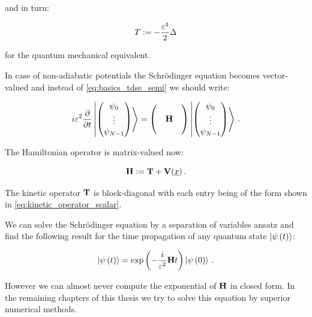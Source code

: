 and in turn:

\begin{equation} \label{eq:kinetic_operator_scalar}
  T := - \frac{\varepsilon^4}{2} \Delta
\end{equation}

for the quantum mechanical equivalent.

In case of non-adiabatic potentials the Schrödinger equation becomes vector-valued
and instead of \eqref{eq:basics_tdse_semi} we should write:

\begin{equation} \label{eq:basics_tdse_vector}
  i \varepsilon^2 \frac{\partial}{\partial t} \Ket{ \begin{pmatrix}
                                                   \psi_0 \\
                                                   \vdots \\
                                                   \psi_{N-1}
                                                 \end{pmatrix}
                                               }
  =
  \begin{pmatrix}
    {} & {}       & {} \\
    {} & \mathbf{H}  & {} \\
    {} & {}       & {}
  \end{pmatrix}
  \Ket{ \begin{pmatrix}
          \psi_0 \\
          \vdots \\
          \psi_{N-1}
        \end{pmatrix} } \,.
\end{equation}

The Hamiltonian operator is matrix-valued now:

\begin{equation}
  \mathbf{H} := \mathbf{T} + \mathbf{V}(\underline{x}) \,.
\end{equation}

The kinetic operator $\mathbf{T}$ is block-diagonal with each entry being of
the form shown in \eqref{eq:kinetic_operator_scalar}.

We can solve the Schrödinger equation by a separation of variables ansatz and
find the following result for the time propagation of any quantum state $\Ket{\psi\left( t \right)}$:

\begin{equation} \label{eq:basics_analytic_time_propagation}
  \Ket{\psi\left( t \right)} = \exp\left(- \frac{i}{\varepsilon^2} \mathbf{H} t \right) \Ket{\psi\left( 0 \right)} \,.
\end{equation}

However we can almost never compute the exponential of $\mathbf{H}$ in closed form.
In the remaining chapters of this thesis we try to solve this equation by
superior numerical methods.
